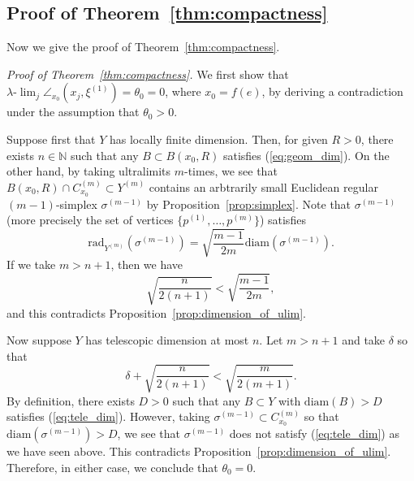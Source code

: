 \documentclass[12pt]{amsart}
\numberwithin{equation}{section}
\theoremstyle{plain}
\theoremstyle{definition}
\theoremstyle{remark}
\newcommand{\N}{{\mathbb N}}
\newcommand{\diam}[1]{\mathrm{diam}(#1)}
\newcommand{\rad}[2]{\mathrm{rad}_{#1}({#2})}
\newcommand{\ulim}{\lambda{\text{-}}\!\lim}
\newcommand{\xxi}[1]{\xi^{(#1)}}
\newcommand{\cone}[2][]{C_{#1}^{(#2)}}
\newcommand{\zure}{\theta_0}
\begin{document}
\subsection{Proof of Theorem~\ref{thm:compactness}}
\label{sec:the_proof}

Now we give the proof of Theorem~\ref{thm:compactness}. 

\noindent
{\it Proof of Theorem~\ref{thm:compactness}.}
 We first show that $\ulim_j \angle_{x_0}(x_j,\xxi{1})=\zure=0$, where
 $x_0=f(e)$, by deriving a contradiction under the assumption that
 $\zure>0$.  
 
 Suppose first that $Y$ has locally finite dimension. 
 Then, for given $R>0$, there exists $n \in \N$ such that
 any $B \subset B(x_0,R)$ satisfies (\ref{eq:geom_dim}). 
 On the other hand, by taking ultralimits $m$-times, we see that
 $B(x_0, R)\cap \cone[x_0]{m}\subset Y^{(m)}$ contains an arbtrarily small
 Euclidean regular 
 $(m-1)$-simplex $\sigma^{(m-1)}$ by Proposition~\ref{prop:simplex}. 
 Note that $\sigma^{(m-1)}$ (more precisely the set of vertices
 $\{p^{(1)}, \dots, p^{(m)}\}$) satisfies
\begin{equation*}
 \rad{Y^{(m)}}{\sigma^{(m-1)}} = 
 \sqrt{\frac{m-1}{2m}}\diam{\sigma^{(m-1)}}. 
\end{equation*}
 If we take $m>n+1$, then we have
\begin{equation*}
 \sqrt{\frac{n}{2(n+1)}} < \sqrt{\frac{m-1}{2m}}, 
\end{equation*}
 and this contradicts Proposition~\ref{prop:dimension_of_ulim}. 

 Now suppose $Y$ has telescopic dimension at most $n$. 
 Let $m>n+1$ and take $\delta$ so that
\begin{equation*}
 \delta + \sqrt{\frac{n}{2(n+1)}} < \sqrt{\frac{m}{2(m+1)}}.
\end{equation*}
 By definition, there exists $D>0$ such that any $B \subset Y$ with
 $\diam{B}>D$ satisfies (\ref{eq:tele_dim}). 
 However, taking $\sigma^{(m-1)} \subset \cone[x_0]{m}$ so that
 $\diam{\sigma^{(m-1)}}>D$, we see that $\sigma^{(m-1)}$
 does not satisfy (\ref{eq:tele_dim}) as we have seen above. 
 This contradicts Proposition~\ref{prop:dimension_of_ulim}. 
 Therefore, in either case, we conclude that $\zure=0$. 
\end{document}
